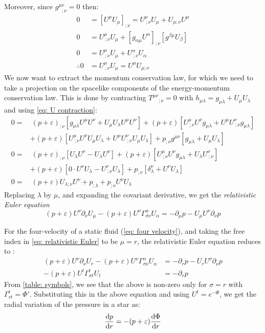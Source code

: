 \documentclass[a4paper,12pt,onehalfspacing]{report}
\begin{document}
Moreover, since $g^{\mu\nu}_{\ \ \ ;\nu}= 0$ then: 
\begin{align}
    0&= [U^\mu U_\mu]_{;\nu}= U^\mu_{\ ;\nu}U_\mu + U_{\mu;\nu}U^\mu\nonumber\\
    0&=U^\mu_{\ ;\nu}U_\mu + [g_{\alpha\mu}U^\alpha]_{;\nu}[g^{\beta\mu}U_\beta]\nonumber\\
    0&=U^\mu_{\ ;\nu}U_\mu + U^\alpha_{\ ;\nu}U_\alpha\nonumber\\
    \therefore 0&= U^\mu_{\ ;\nu}U_\mu= U^\mu U_{\mu;\nu} \label{eq: U contraction}
\end{align}
We now want to extract the momentum conservation law, for which we need to take a projection on the spacelike components of the energy-momentum conservation law. This is done by contracting $T^{\mu\nu}{}_{;\nu}=0$ with $h_{\mu\lambda}= g_{\mu\lambda}+U_{\mu}U_\lambda$ and using \cref{eq: U contraction}:
\begin{align*}
    0 =&\ (p+\varepsilon)_{;\nu}[g_{\mu\lambda}U^\mu U^\nu+U_{\mu}U_\lambda U^\mu U^\nu]+(p+\varepsilon)[U^\mu_{\ ;\nu} U^\nu g_{\mu\lambda} + U^\mu U^\nu_{\ ;\nu}g_{\mu\lambda}] \\
    &+(p+\varepsilon)[U^\mu_{\ ;\nu} U^\nu U_{\mu}U_\lambda + U^\mu U^\nu_{\ ;\nu}U_{\mu}U_\lambda]+ p_{;\nu}g^{\mu\nu}[g_{\mu\lambda}+U_{\mu}U_\lambda]\\
    0 =&\ (p+\varepsilon)_{;\nu}[U_\lambda U^\nu-U_\lambda U^\nu]+(p+\varepsilon)[U^\mu_{\ ;\nu} U^\nu g_{\mu\lambda} + U_\lambda U^\nu_{\ ;\nu}] \\
    &+(p+\varepsilon)[0\cdot U^\nu U_\lambda - U^\nu_{\ ;\nu}U_\lambda]+ p_{;\nu}[\delta^\nu_\lambda+U^{\nu}U_\lambda]\\
    0 =&\ (p+\varepsilon)U_{\lambda;\nu} U^\nu + p_{;\lambda}+p_{;\nu}U^{\nu}U_\lambda
\end{align*}
Replacing $\lambda$ by $\mu$, and expanding the covariant derivative, we get the \emph{relativistic Euler equation}
\begin{equation}
    (p+\varepsilon)U^\nu\partial_\nu U_\mu -(p+\varepsilon)U^\nu \Gamma^{\alpha}_{\sigma\nu}U_\alpha = -\partial_\mu p- U_\mu U^\nu \partial_\nu p \label{eq: relativistic Euler}
\end{equation}

For the four-velocity of a static fluid (\cref{eq: four velocity}), and taking the free index in \cref{eq: relativistic Euler} to be $\mu=r$, the relativistic Euler equation reduces to :
\begin{align*}
    (p+\varepsilon)U^\nu\partial_\nu U_r -(p+\varepsilon)U^\nu \Gamma^{\alpha}_{\sigma\nu}U_\alpha &= -\partial_r p- U_r U^\nu \partial_\nu p\\
    -(p+\varepsilon)U^t \Gamma^{t}_{\sigma t}U_t &= -\partial_r p
\end{align*}
From \cref{table: symbols}, we see that the above is non-zero only for $\sigma= r$ with $\Gamma^{t}_{r t}= \Phi'$. Substituting this in the above equation and using $U^t= e^{-\Phi}$, we get the radial variation of the pressure in a star as:
\begin{equation}
    \dv{p}{r}= -(p+\varepsilon)\dv{\Phi}{r} \label{eq: dp_dr}
\end{equation}
\end{document}
